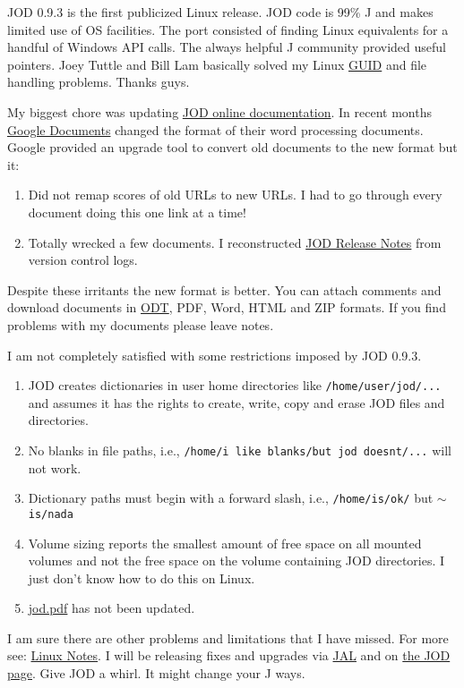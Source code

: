 JOD 0.9.3 is the first publicized Linux release. JOD code is 99\% J and
makes limited use of OS facilities. The port consisted of finding Linux
equivalents for a handful of Windows API calls. The always helpful J
community provided useful pointers. Joey Tuttle and Bill Lam basically
solved my Linux
\href{http://en.wikipedia.org/wiki/Globally\_unique\_identifier}{GUID}
and file handling problems. Thanks guys.

My biggest chore was updating
\href{https://docs.google.com/document/d/1pR1kc27OwTEGZ4BavhYT4RVvAtlEEUzueT9T-URY9t0/edit?hl=en\_US}{JOD
online documentation}. In recent months
\href{https://docs.google.com}{Google Documents} changed the format of
their word processing documents. Google provided an upgrade tool to
convert old documents to the new format but it:

\begin{enumerate}
\item
  Did not remap scores of old URLs to new URLs. I had to go through
  every document doing this one link at a time!
\item
  Totally wrecked a few documents. I reconstructed
  \href{https://docs.google.com/document/d/1aBdt8rwdOq\_CQ52qRQ-js1MwiaovC2pxlQq-Z9VosOg/edit?hl=en\_US}{JOD
  Release Notes} from version control logs.
\end{enumerate}
Despite these irritants the new format is better. You can attach
comments and download documents in
\href{http://www.coolutils.com/Formats/ODT}{ODT}, PDF, Word, HTML and
ZIP formats. If you find problems with my documents please leave notes.

I am not completely satisfied with some restrictions imposed by JOD
0.9.3.

\begin{enumerate}
\item
  JOD creates dictionaries in user home directories like
  \texttt{/home/user/jod/...} and assumes it has the rights to create,
  write, copy and erase JOD files and directories.
\item
  No blanks in file paths, i.e., \texttt{/home/i like blanks/but jod doesnt/...}
  will not work.
\item
  Dictionary paths must begin with a forward slash, i.e., \texttt{/home/is/ok/}
  but \ensuremath{\sim}\texttt{is/nada}
\item
  Volume sizing reports the smallest amount of free space on all mounted
  volumes and not the free space on the volume containing JOD
  directories. I just don't know how to do this on Linux.
\item
  \href{http://www.box.net/shared/gajfu50gc0}{jod.pdf} has not been
  updated.
\end{enumerate}
I am sure there are other problems and limitations that I have missed.
For more see:
\href{https://docs.google.com/document/d/18pwvvpeuJiU\_HCsuReiKyOxmZORrlMRe45OYE\_cWq0w/edit?hl=en\_US}{Linux
Notes}. I will be releasing fixes and upgrades via
\href{http://www.jsoftware.com/jwiki/JAL/User\%20Guide}{JAL} and on
\href{http://bakerjd99.wordpress.com/the-jod-page/}{the JOD page}. Give
JOD a whirl. It might change your J ways.


